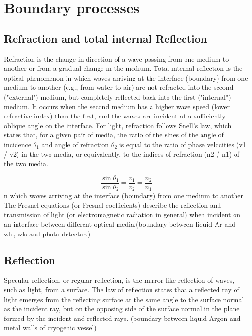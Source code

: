 \documentclass{article}
\begin{document}
  \section{Boundary processes}
  \subsection{Refraction and total internal Reflection}
Refraction is the change in direction of a wave passing from one medium to another or from a gradual change in the medium.
Total internal reflection is the optical phenomenon in which waves arriving at the interface (boundary) from one medium to another (e.g., from water to air) are not refracted into the second ("external") medium, but completely reflected back into the first ("internal") medium. It occurs when the second medium has a higher wave speed (lower refractive index) than the first, and the waves are incident at a sufficiently oblique angle on the interface.
For light, refraction follows Snell's law, which states that, for a given pair of media, the ratio of the sines of the angle of incidence $\theta_1$ and angle of refraction $\theta_2$ is equal to the ratio of phase velocities (v1 / v2) in the two media, or equivalently, to the indices of refraction (n2 / n1) of the two media.

  \begin{equation}
    \frac{\sin \theta _{1}}{\sin \theta _{2}}=\frac{v_{1}}{v_{2}}=\frac {n_{2}}{n_{1}}
  \label{equ:snell}
\end{equation}
    n which waves arriving at the interface (boundary) from one medium to another
  The Fresnel equations (or Fresnel coefficients) describe the reflection and transmission of light (or electromagnetic radiation in general) when incident on an interface between different optical media.(boundary between liquid Ar and wls, wls and
  photo-detector.)

\subsection{Reflection} 
 Specular reflection, or regular reflection, is the mirror-like reflection of waves, such as light, from a surface.
  The law of reflection states that a reflected ray of light emerges from the reflecting surface at the same angle to the surface normal as the incident ray, but on the opposing side of the surface normal in the plane formed by the incident and reflected rays.
  (boundary between liquid  Argon and metal walls of cryogenic vessel)
\end{document}
